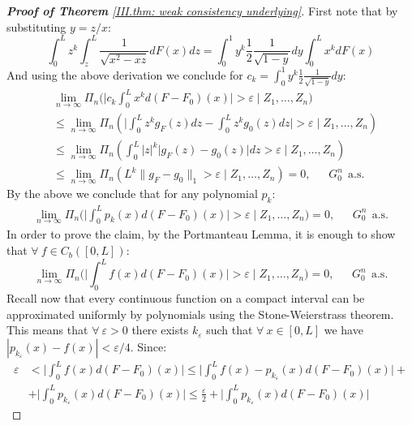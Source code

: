 \begin{proof}[\hypertarget{III.proof weak consistency underlying}{\textbf{Proof of Theorem} \ref{III.thm: weak consistency underlying}}]
First note that by substituting $y = z/x$:
$$ \int_{0}^{L} z^k \int_{z}^{L} \frac{1}{\sqrt{x^2 -xz}} dF(x)dz = \int_{0}^{1}y^k \frac{1}{2} \frac{1}{\sqrt{1-y}}dy \int_{0}^{L} x^k dF(x)$$
And using the above derivation we conclude for $c_k = \int_{0}^{1}y^k \frac{1}{2} \frac{1}{\sqrt{1-y}}dy$:
\begin{align*}
    & \lim_{n \rightarrow \infty} \Pi_n \bigg( \bigg|c_k  \int_0^L x^k d(F - F_0) (x) \bigg| > \varepsilon \mid Z_1,\ldots,Z_n \bigg) \\
    &\leq \lim_{n \rightarrow \infty} \Pi_n \left(\bigg| \int_0^{L} z^k g_{\scriptscriptstyle{F}} (z) dz - \int_0^{L} z^k g_0 (z) dz \bigg| > \varepsilon \mid Z_1,\ldots,Z_n \right)  \\ 
    &\leq \lim_{n \rightarrow \infty} \Pi_n \left( \int_0^{L} |z|^k \big|g_{\scriptscriptstyle{F}} (z) - g_0 (z)\big| dz  > \varepsilon \mid Z_1,\ldots,Z_n \right)  \\
    &\leq \lim_{n \rightarrow \infty} \Pi_n (L^k \|g_{\scriptscriptstyle{F}} - g_0\|_1 > \varepsilon \mid Z_1,\ldots,Z_n ) = 0, \: \: \: \: \: \: \: G^n_0 \: \: \text{a.s.}
\end{align*}
By the above we conclude that for any polynomial $p_k$:
\begin{align}\label{III.eq: polynomial convergence}
\lim_{n \rightarrow \infty} \Pi_n \bigg( \bigg| \int_0^L p_k(x) d(F - F_0) (x) \bigg| > \varepsilon \mid Z_1,\ldots,Z_n \bigg) = 0, \: \: \: \: \: \: \:  G^n_0 \: \: \text{a.s.}
\end{align}
In order to prove the claim, by the Portmanteau Lemma, it is enough to show that $\forall \: f \in C_b([0,L])$:
$$ \lim_{n \rightarrow \infty} \Pi_n \bigg( \bigg| \int_0^L f(x) d(F - F_0) (x) \bigg| > \varepsilon \mid Z_1,\ldots,Z_n \bigg) = 0, \: \: \: \: \: \: \:  G^n_0 \: \: \text{a.s.}$$
Recall now that every continuous function on a compact interval can be approximated uniformly by polynomials using the Stone-Weierstrass theorem. This means that $\forall \: \varepsilon > 0$ there exists $k_\varepsilon$ such that $\forall \: x \in [0,L]$ we have $|p_{k_{\varepsilon}} (x) - f(x)| < \varepsilon/4$. Since:
\begin{align*}
    \varepsilon &< \bigg| \int_0^L f(x) d(F - F_0) (x) \bigg| \leq \bigg| \int_0^L f(x) - p_{k_{\varepsilon}}(x) d(F - F_0) (x) \bigg| +  \\ 
    &+ \bigg| \int_0^L p_{k_{\varepsilon}}(x) d(F - F_0) (x) \bigg| \leq \frac{\varepsilon}{2} + \bigg| \int_0^L p_{k_{\varepsilon}}(x) d(F - F_0) (x) \bigg| 

\end{align*}
\end{proof}
